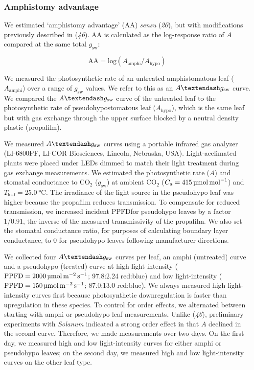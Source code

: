 \documentclass[
  letterpaper,
  DIV=11,
  numbers=noendperiod]{scrartcl}
\newcommand{\aax}{$\mathrm{AA}$}
\newcommand{\Aamphi}{$A_{\mathrm{amphi}}$}
\newcommand{\Ahypo}{$A_{\mathrm{hypo}}$}
\newcommand{\agcurve}{$A \textendash g_\text{sw}$}
\newcommand{\caequals}[1]{$C_\mathrm{a} = \qty{#1}{\micro\mol\raiseto{-1}\mol}$}
\newcommand{\gsw}{$g_\text{sw}$}
\newcommand{\ppfd}{$\mathrm{PPFD}$}
\newcommand{\ppfdequals}[1]{$\mathrm{PPFD} = \qty{#1}{\micro\mol\raiseto{-2}\meter\raiseto{-1}\second}$}
\newcommand{\tleafequals}[1]{$T_\mathrm{leaf} = \qty{#1}{\degreeCelsius}$}
\begin{document}
\subsubsection{Amphistomy advantage}\label{amphistomy-advantage}

We estimated `amphistomy advantage' (\aax) \emph{sensu} (\emph{20}), but
with modifications previously described in (\emph{46}). \aax{} is
calculated as the log-response ratio of \(A\) compared at the same total
\gsw:

\[\mathrm{AA} = \mathrm{log}(A_{\mathrm{amphi}} / A_{\mathrm{hypo}})\]

We measured the photosynthetic rate of an untreated amphistomatous leaf
(\Aamphi) over a range of \gsw{} values. We refer to this as an
\agcurve{} curve. We compared the \agcurve{} curve of the untreated leaf
to the photosynthetic rate of pseudohypostomatous leaf (\Ahypo), which
is the same leaf but with gas exchange through the upper surface blocked
by a neutral density plastic (propafilm).

We measured \agcurve{} curves using a portable infrared gas analyzer
(LI-6800PF, LI-COR Biosciences, Lincoln, Nebraska, USA).
Light-acclimated plants were placed under LEDs dimmed to match their
light treatment during gas exchange measurements. We estimated the
photosynthetic rate (\(A\)) and stomatal conductance to CO\(_2\) (\gsw)
at ambient CO\(_2\) (\caequals{415}) and \tleafequals{25.0}. The
irradiance of the light source in the pseudohypo leaf was higher because
the propafilm reduces transmission. To compensate for reduced
transmission, we increased incident \ppfd for pseudohypo leaves by a
factor 1/0.91, the inverse of the measured transmissivity of the
propafilm. We also set the stomatal conductance ratio, for purposes of
calculating boundary layer conductance, to 0 for pseudohypo leaves
following manufacturer directions.

We collected four \agcurve{} curves per leaf, an amphi (untreated) curve
and a pseudohypo (treated) curve at high light-intensity
(\ppfdequals{2000}; 97.8:2.24 red:blue) and low light-intensity
(\ppfdequals{150}; 87.0:13.0 red:blue). We always measured high
light-intensity curves first because photosynthetic downregulation is
faster than upregulation in these species. To control for order effects,
we alternated between starting with amphi or pseudohypo leaf
measurements. Unlike (\emph{46}), preliminary experiments with
\emph{Solanum} indicated a strong order effect in that \(A\) declined in
the second curve. Therefore, we made measurements over two days. On the
first day, we measured high and low light-intensity curves for either
amphi or pseudohypo leaves; on the second day, we measured high and low
light-intensity curves on the other leaf type.
\end{document}
